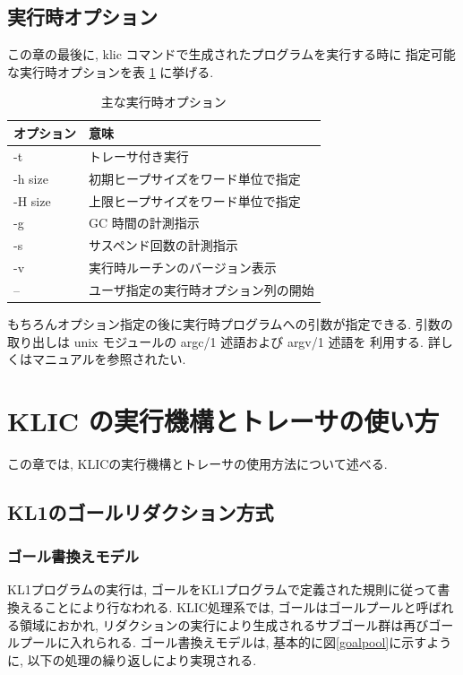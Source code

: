 \documentclass[a4,titlepage]{jsreport}
\begin{document}

\section{実行時オプション}
この章の最後に, klic コマンドで生成されたプログラムを実行する時に
指定可能な実行時オプションを表 \ref{tab:eoptions} に挙げる.

\begin{table}[hbt]
\caption{主な実行時オプション}
\label{tab:eoptions}
\begin{center}
\begin{tabular}{l||l}
\hline
オプション & 意味\\
\hline\hline
-t & トレーサ付き実行\\
\hline
-h size& 初期ヒープサイズをワード単位で指定\\
\hline
-H size& 上限ヒープサイズをワード単位で指定\\
\hline
-g & GC 時間の計測指示\\
\hline
-s & サスペンド回数の計測指示\\
\hline
-v & 実行時ルーチンのバージョン表示\\
\hline
-- & ユーザ指定の実行時オプション列の開始\\
\hline
\end{tabular}
\end{center}
\end{table}

もちろんオプション指定の後に実行時プログラムへの引数が指定できる.
引数の取り出しは unix モジュールの argc/1 述語および argv/1 述語を
利用する.  詳しくはマニュアルを参照されたい.


\chapter{KLIC の実行機構とトレーサの使い方}

この章では, KLICの実行機構とトレーサの使用方法について述べる.

\section{KL1のゴールリダクション方式}
\subsection{ゴール書換えモデル}

KL1プログラムの実行は, ゴールをKL1プログラムで定義された規則に従って書
換えることにより行なわれる. 
KLIC処理系では, ゴールはゴールプールと呼ばれる領域におかれ, 
リダクションの実行により生成されるサブゴール群は再びゴールプールに入れられる.
ゴール書換えモデルは, 基本的に図\ref{goalpool}に示すように, 
以下の処理の繰り返しにより実現される.  
\end{document}
